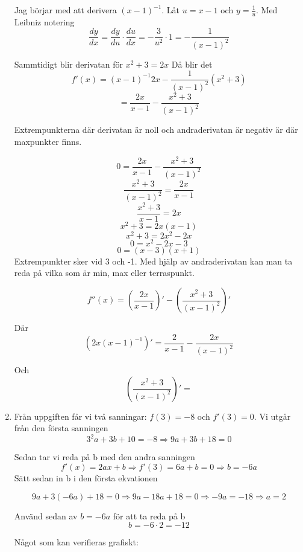 \documentclass[a4paper,12pt]{article}
\begin{document}
\begin{enumerate}
    Jag börjar med att derivera $(x-1)^{-1}$.
    Låt $u=x-1$ och $y=\frac{1}{u}$.
    Med Leibniz notering 
    $$\frac{dy}{dx}=\frac{dy}{du}\cdot \frac{du}{dx}
    =-\frac{3}{u^2}\cdot 1=-\frac{1}{(x-1)^2}$$
    
    Sammtidigt blir derivatan för $x^2+3=2x$
    Då blir det 
    $$f'(x)=(x-1)^{-1}2x-\frac{1}{(x-1)^2}(x^2+3)$$
    $$=\frac{2x}{x-1}-\frac{x^2+3}{(x-1)^2}$$
    
    Extrempunkterna där derivatan är noll och
    andraderivatan är negativ är där 
    maxpunkter finns. 
    
    $$0=\frac{2x}{x-1}-\frac{x^2+3}{(x-1)^2}$$
    $$\frac{x^2+3}{(x-1)^2}=\frac{2x}{x-1}$$
    $$\frac{x^2+3}{x-1}={2x}$$
    $$x^2+3=2x(x-1)$$
    $$x^2+3=2x^2-2x$$
    $$0=x^2-2x-3$$
    $$0=(x-3)(x+1)$$
    Extrempunkter sker vid 3 och -1. Med hjälp av andraderivatan
    kan man ta reda på vilka som är min, max eller terraspunkt.
    
    $$f''(x)=(\frac{2x}{x-1})'-(\frac{x^2+3}{(x-1)^2})'$$
    
    Där 
    $$(2x(x-1)^{-1})'=\frac{2}{x-1}-\frac{2x}{(x-1)^2}$$
    
    Och
    $$(\frac{x^2+3}{(x-1)^2})'=$$

    \item 
    Från uppgiften får vi två sanningar: $f(3)=-8$ och $f'(3)=0$. 
    Vi utgår från den första sanningen
    $$3^2a+3b+10=-8\Rightarrow 9a+3b+18=0$$

    Sedan tar vi reda på b med den andra sanningen
    $$f'(x)=2ax+b\Rightarrow f'(3)=6a+b=0\Rightarrow b=-6a$$
    Sätt sedan in b i den första ekvationen

    $$9a+3(-6a)+18=0\Rightarrow 9a-18a+18=0 
    \Rightarrow -9a=-18\Rightarrow a=2$$

    Använd sedan av $b=-6a$ för att ta reda på b
    $$b=-6\cdot 2= -12$$

    Något som kan verifieras grafiskt:


\end{enumerate}
\end{document}
